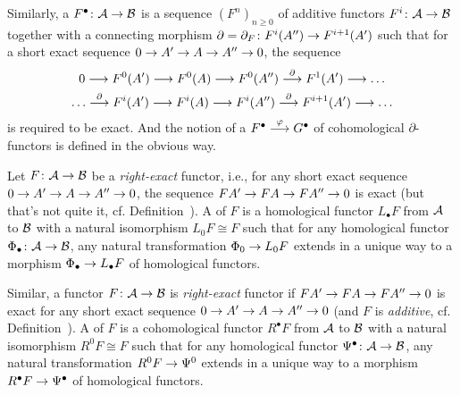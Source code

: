 \documentclass[a4paper,parskip=half,numbers=enddot, DIV=12]{scrreprt}
\begin{document}
\begin{defi}
	Similarly, a  $F^\bullet \colon\Aa\morphism\Bb$ is a sequence $(F^n)_{n\geq 0}$ of additive functors $F^i\colon\Aa\morphism\Bb$ together with a connecting morphism $\partial=\partial_F\colon F^i(A'')\morphism F^{i+1}(A')$ such that for a short exact sequence $0\morphism A'\morphism A\morphism A''\morphism 0$, the sequence 
	\begin{multline*}
		0\morphism F^0(A')\morphism F^0(A)\morphism F^0(A'')\morphism[\partial] F^1(A')\morphism\ldots\\
		\ldots\morphism[\partial]F^i(A')\morphism F^i(A)\morphism F^i(A'')\morphism[\partial]F^{i+1}(A')\morphism\ldots
	\end{multline*}
	 is required to be exact. And the notion of a  $F^\bullet \morphism[\phi]G^\bullet $ of cohomological $\partial$-functors is defined in the obvious way.
	
	Let $F\colon\Aa\morphism\Bb$ be a \emph{right-exact} functor, i.e., for any short exact sequence $0\morphism A'\morphism A\morphism A''\morphism 0$, the sequence $FA'\morphism FA\morphism FA''\morphism 0$ is exact (but that's not quite it, cf. Definition~). A  of $F$ is a homological functor $L_\bullet F$ from $\mathcal{A}$ to $\mathcal{B}$ with a natural isomorphism $L_0F\cong F$ such that for any homological functor $\Phi_\bullet \colon \Aa\morphism\Bb$, any natural transformation $\Phi_0\morphism L_0F$ extends in a unique way to a morphism $\Phi_\bullet \morphism L_\bullet F$ of homological functors.
	
	Similar, a functor $F\colon\Aa\morphism\Bb$ is \emph{right-exact} functor if $FA'\morphism FA\morphism FA''\morphism 0$ is exact for any short exact sequence $0\morphism A'\morphism A\morphism A''\morphism 0$ (and $F$ is \emph{additive}, cf. Definition~). A  of $F$ is a cohomological functor $R^\bullet F$ from $\mathcal{A}$ to $\mathcal{B}$ with a natural isomorphism $R^0F\cong F$ such that for any homological functor $\Psi^\bullet \colon \Aa\morphism\Bb$, any natural transformation $R^0F\morphism \Psi^0$ extends in a unique way to a morphism $R^\bullet F\morphism \Psi^\bullet $ of homological functors.
\end{defi}
\end{document}
